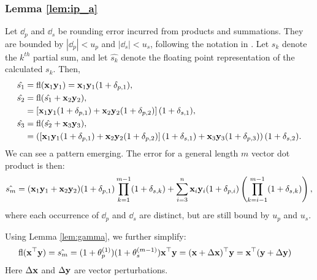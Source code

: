 \subsubsection{Lemma \ref{lem:ip_a}}
Let $\dd_p$ and $\dd_s$ be rounding error incurred from products and summations.
They are bounded by $|\dd_p| < u_p$ and $|\dd_s| < u_s$, following the notation in \cite{Higham2002}. Let $s_k$ denote the $k^{th}$ partial sum, and let $\hat{s_k}$ denote the floating point representation of the calculated $s_k$.
Then,
\begin{align*}
	\hat{s_1} &= \mathrm{fl} (\mathbf{x}_1\mathbf{y}_1) = \mathbf{x}_1\mathbf{y}_1(1 + \delta_{p,1}),\\
	\hat{s_2} &= \mathrm{fl}(\hat{s_1} + \mathbf{x}_2\mathbf{y}_2), \\
	&= \left[\mathbf{x}_1\mathbf{y}_1(1 + \delta_{p,1}) + \mathbf{x}_2\mathbf{y}_2(1 + \delta_{p,2})\right](1+\delta_{s,1}),\\
	\hat{s_3} &= \mathrm{fl}(\hat{s_2}+\mathbf{x}_3\mathbf{y}_3), \\
	&= \left(\left[\mathbf{x}_1\mathbf{y}_1(1 + \delta_{p,1}) + \mathbf{x}_2\mathbf{y}_2(1 + \delta_{p,2})\right](1+\delta_{s,1})  + \mathbf{x}_3\mathbf{y}_3(1+\delta_{p,3})\right)(1+\delta_{s,2}).
\end{align*}
We can see a pattern emerging. 
The error for a general length $m$ vector dot product is then:
\begin{equation}
\label{eqn:dperr_1}
\hat{s_m} = (\bb{x}_1\bb{y}_1+\bb{x}_2\bb{y}_2)(1+ \dd_{p,1})\prod_{k=1}^{m-1}(1+\dd_{s,k}) + \sum_{i=3}^n \bb{x}_i\bb{y}_i(1+\dd_{p,i})\left(\prod_{k=i-1}^{m-1}(1+\dd_{s,k})\right),
\end{equation}
where each occurrence of $\dd_p$ and $\dd_s$ are distinct, but are still bound by $u_p$ and $u_s$.

Using Lemma \ref{lem:gamma}, we further simplify:
\begin{align*}
\fl(\bb{x}^{\top}\bb{y}) &= \hat{s_m} = (1+\tth_p^{(1)})(1+\tth_s^{(m-1)})\bb{x}^{\top}\bb{y}%
= (\bb{x}+\Delta\bb{x})^{\top}\bb{y} = \bb{x}^{\top}(\bb{y}+\Delta\bb{y})
\end{align*}
Here $\Delta\mathbf{x}$ and $\Delta\mathbf{y}$ are vector perturbations.

